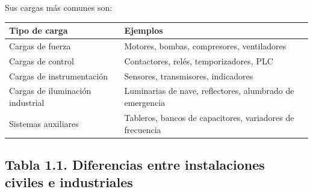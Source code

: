 \documentclass[
  spanish,
  letterpaper,
  DIV=11,
  numbers=noendperiod]{scrreprt}
\newcounter{none} %
\begin{document}
Sus cargas más comunes son:

{\def\LTcaptype{none} %
\begin{longtable}[]{@{}
  >{\raggedright\arraybackslash}p{}
  >{\raggedright\arraybackslash}p{}@{}}
\toprule\noalign{}
\begin{minipage}[b]{\linewidth}\raggedright
Tipo de carga
\end{minipage} & \begin{minipage}[b]{\linewidth}\raggedright
Ejemplos
\end{minipage} \\
\midrule\noalign{}
\endhead
\bottomrule\noalign{}
\endlastfoot
Cargas de fuerza & Motores, bombas, compresores, ventiladores \\
Cargas de control & Contactores, relés, temporizadores, PLC \\
Cargas de instrumentación & Sensores, transmisores, indicadores \\
Cargas de iluminación industrial & Luminarias de nave, reflectores,
alumbrado de emergencia \\
Sistemas auxiliares & Tableros, bancos de capacitores, variadores de
frecuencia \\
\end{longtable}
}

\subsection{Tabla 1.1. Diferencias entre instalaciones civiles e
industriales}\label{tabla-1.1.-diferencias-entre-instalaciones-civiles-e-industriales}
\end{document}
